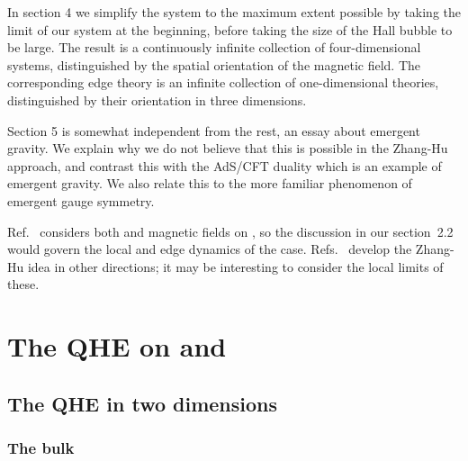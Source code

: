 \documentclass[a4paper,12pt]{article}
\providecommand{\R}{R}
\providecommand{\sect}[1]{\section{#1}\setcounter{equation}{0}}
\begin{document}
In section 4 we simplify the system to the maximum extent possible by
taking the \coordHE{} limit of our system at the beginning, before taking
the size of the Hall bubble to be large.  The result is a continuously
infinite collection of four-dimensional \coordHE{} systems, distinguished by the
spatial orientation of the magnetic field.  The corresponding edge theory is
an infinite collection of one-dimensional theories, distinguished by their
orientation in three dimensions.

Section 5 is somewhat independent from the rest, an essay about emergent
gravity.  We explain why we do not believe that this is possible in the
Zhang-Hu approach, and contrast this with the AdS/CFT duality which is an
example of emergent gravity.  We also relate this to the more familiar
phenomenon of emergent gauge symmetry.

Ref.~\cite{kara} considers both \coordHE{} and \coordHE{} magnetic fields on \coordHE{},
so the discussion in our section~2.2 would govern the local and edge
dynamics of the \coordHE{} case.  Refs.~\cite{followup} develop the Zhang-Hu
idea in other directions; it may be interesting to consider the local limits of
these.


\sect{The \coordHE{} QHE on \myHighlight{$\R^2$}\coordHE{} and \myHighlight{$\R^4$}\coordHE{}}

\subsection{The \coordHE{} QHE in two dimensions}

\subsubsection{The bulk}
\end{document}
